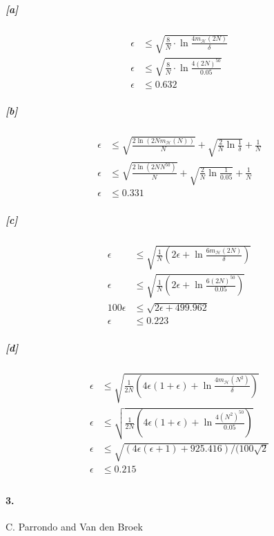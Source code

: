 \documentclass[10pt,letter]{article}
\begin{document}
	\subparagraph{[a]}
		\begin{align*}
		\epsilon &\leq \sqrt{\frac{8}{N} \cdot \ln{\frac{4m_\mathcal{H}(2N)}{\delta}} } \\
		\epsilon &\leq \sqrt{\frac{8}{N} \cdot \ln{\frac{4(2N)^{50}}{0.05}} } \\
		\epsilon &\leq 0.632
		\end{align*}
	\subparagraph{[b]}
		\begin{align*}
		\epsilon &\leq \sqrt{\frac{2\ln(2Nm_\mathcal{H}(N))}{N}} + \sqrt{\frac{2}{N} \ln{\frac{1}{\delta}}} + \frac{1}{N} \\
		\epsilon &\leq \sqrt{\frac{2\ln(2N N^{50} )}{N}} + \sqrt{\frac{2}{N} \ln{\frac{1}{0.05}}} + \frac{1}{N} \\
		\epsilon &\leq 0.331
		\end{align*}
	\subparagraph{[c]}
		\begin{align*}
		\epsilon &\leq \sqrt{\frac{1}{N}(2\epsilon + \ln\frac{6m_\mathcal{H}(2N)}{\delta} )} \\
		\epsilon &\leq \sqrt{\frac{1}{N}(2\epsilon + \ln\frac{6 (2N)^{50} }{0.05} )} \\
		100 \epsilon &\leq \sqrt{2 \epsilon +499.962} \\
		\epsilon &\leq 0.223
		\end{align*}
	\subparagraph{[d]} 
		\begin{align*}
		\epsilon &\leq \sqrt{\frac{1}{2N} (4\epsilon(1 +\epsilon) + \ln\frac{4m_\mathcal{H}(N^2)}{\delta} ) } \\
		\epsilon &\leq \sqrt{\frac{1}{2N} (4\epsilon(1 +\epsilon) + \ln\frac{4 (N^2)^{50} }{0.05} ) } \\
		\epsilon &\leq \sqrt{(4 \epsilon (\epsilon+1)+925.416)/(100 \sqrt{2}} \\
		\epsilon &\leq 0.215 \\
		\end{align*}

\paragraph{3.} C. Parrondo and Van den Broek
\end{document}
